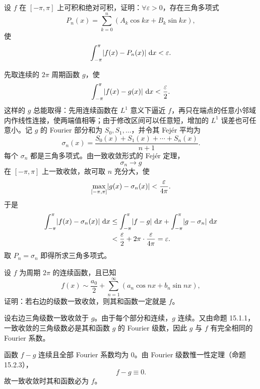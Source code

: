 \begin{xexercise}[8]
设 $f$ 在 $[-\pi,\pi]$ 上可积和绝对可积，证明：$\forall\varepsilon>0$，存在三角多项式
  \[
    P_n(x)=\sum_{k=0}^{n}(A_k\cos kx+B_k\sin kx),
  \]
  使
  \[
    \int_{-\pi}^{\pi}\lvert f(x)-P_n(x)\rvert\,\mathop{}\!\mathrm{d} x<\varepsilon.
  \]
\end{xexercise}
\begin{xsolution}
先取连续的 $2\pi$ 周期函数 $g$，使
\[
  \int_{-\pi}^{\pi}\lvert f(x)-g(x)\rvert\,\mathop{}\!\mathrm{d} x<\frac\varepsilon2.
\]
这样的 $g$ 总能取得：先用连续函数在 $L^1$ 意义下逼近 $f$，再只在端点的任意小邻域内作线性连接，使两端值相等；由于修改区间可以任意短，增加的 $L^1$ 误差也可任意小。记 $g$ 的 Fourier 部分和为 $S_0,S_1,\ldots$，并令其 Fejér 平均为
\[
  \sigma_n(x)=\frac{S_0(x)+S_1(x)+\cdots+S_n(x)}{n+1}.
\]
每个 $\sigma_n$ 都是三角多项式。由一致收敛形式的 Fejér 定理，
\[
  \sigma_n\to g
\]
在 $[-\pi,\pi]$ 上一致收敛，故可取 $n$ 充分大，使
\[
  \max_{[-\pi,\pi]}\lvert g(x)-\sigma_n(x)\rvert
  <\frac{\varepsilon}{4\pi}.
\]
于是
\begin{align*}
  \int_{-\pi}^{\pi}\lvert f(x)-\sigma_n(x)\rvert\,\mathop{}\!\mathrm{d} x
  &\le\int_{-\pi}^{\pi}\lvert f-g\rvert\,\mathop{}\!\mathrm{d} x
   +\int_{-\pi}^{\pi}\lvert g-\sigma_n\rvert\,\mathop{}\!\mathrm{d} x\\
  &<\frac\varepsilon2+2\pi\cdot\frac{\varepsilon}{4\pi}
  =\varepsilon.
\end{align*}
取 $P_n=\sigma_n$ 即得所求三角多项式。
\end{xsolution}


\begin{xexercise}[9]
设 $f$ 为周期 $2\pi$ 的连续函数，且已知
  \[
    f(x)\sim\frac{a_0}{2}+\sum_{n=1}^{\infty}(a_n\cos nx+b_n\sin nx),
  \]
  证明：若右边的级数一致收敛，则其和函数一定就是 $f$。
\end{xexercise}
\begin{xsolution}
设右边三角级数一致收敛于 $g$。由于每个部分和连续，$g$ 连续。又由命题 15.1.1，一致收敛的三角级数必是其和函数 $g$ 的 Fourier 级数，因此 $g$ 与 $f$ 有完全相同的 Fourier 系数。

函数 $f-g$ 连续且全部 Fourier 系数均为 $0$。由 Fourier 级数惟一性定理（命题 15.2.3），
\[
  f-g\equiv0.
\]
故一致收敛时其和函数必为 $f$。
\end{xsolution}


